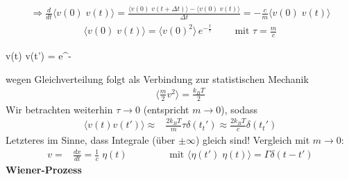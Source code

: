\documentclass[12pt]{article}
\begin{document}
\begin{align*}
\Rightarrow \frac{d}{dt} \langle v(0) \; v(t) \rangle 
= \frac{\langle v(0) \; v(t+ \Delta t) \rangle - \langle v(0) \; v(t) \rangle}{\Delta t} = - \frac{c}{m} \langle v(0) \; v(t) \rangle 
\end{align*}
\begin{align*}
\langle v(0) \; v(t) \rangle = \langle v(0)^2 \rangle \, e^{-\frac{t}{\tau}} \qquad \text{ mit } \tau = \frac{m}{c}
\end{align*}

\begin{tcolorbox}[ams align, title= Autokorrelationsfunktion , colback=blue!10!white, colframe=blue!30!black] 
\langle v(t) \; v(t') \rangle =  e^{- }
\end{tcolorbox}
wegen Gleichverteilung folgt als Verbindung zur statistischen Mechanik
\begin{align*}
\langle \frac{m}{2} v^2 \rangle = \frac{k_B T}{2} 
\end{align*}
Wir betrachten weiterhin $\tau \to 0$ (entspricht $ m\to 0$), sodass
\begin{align*}
\langle v(t) v(t') \rangle \approx & \frac{2 k_B T}{m} \tau \delta (t_t') \approx \frac{2 k_B T}{c} \delta (t_t') 
\end{align*}
Letzteres im Sinne, dass Integrale (über $\pm \infty$) gleich sind! Vergleich mit $m \to 0$:
\begin{align*}
v=& \frac{dx}{dt}= \frac{1}{c} \; \eta (t) \qquad \qquad \mbox{ mit } \langle \eta (t')  \; \eta (t) \rangle = \Gamma \delta (t-t') 
\end{align*}
\textbf{Wiener-Prozess} 
\end{document}

